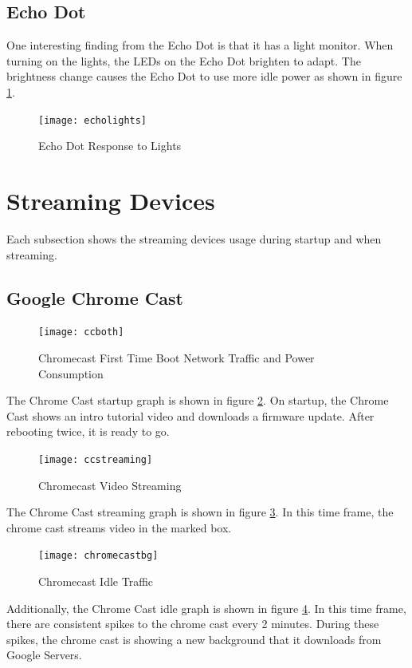 \subsection{Echo Dot}

One interesting finding from the Echo Dot is that it has a light monitor. When turning on the lights, the LEDs on the Echo Dot brighten to adapt. The brightness change causes the Echo Dot to use more idle power as shown in figure \ref{fig:echolights}.

\begin{figure}[H]
  \centering
    \texttt{[image: echolights]}
  \caption{Echo Dot Response to Lights}
  \label{fig:echolights}
\end{figure}

\section{Streaming Devices}
\label{Streaming Devices}

Each subsection shows the streaming devices usage during startup and when streaming.

\subsection{Google Chrome Cast}
\begin{figure}[H]
  \centering
  \texttt{[image: ccboth]}
  \caption{Chromecast First Time Boot Network Traffic and Power Consumption}
  \label{fig:ccboth}
\end{figure}

The Chrome Cast startup graph is shown in figure \ref{fig:ccboth}. On startup, the Chrome Cast shows an intro tutorial video and downloads a firmware update. After rebooting twice, it is ready to go.

\begin{figure}[H]
  \centering
  \texttt{[image: ccstreaming]}
  \caption{Chromecast Video Streaming}
  \label{fig:ccstream}
\end{figure}

The Chrome Cast streaming graph is shown in figure \ref{fig:ccstream}. In this time frame, the chrome cast streams video in the marked box.

\begin{figure}[H]
  \centering
  \texttt{[image: chromecastbg]}
  \caption{Chromecast Idle Traffic}
  \label{fig:ccbg}
\end{figure}

Additionally, the Chrome Cast idle graph is shown in figure \ref{fig:ccbg}. In this time frame, there are consistent spikes to the chrome cast every 2 minutes. During these spikes, the chrome cast is showing a new background that it downloads from Google Servers.

